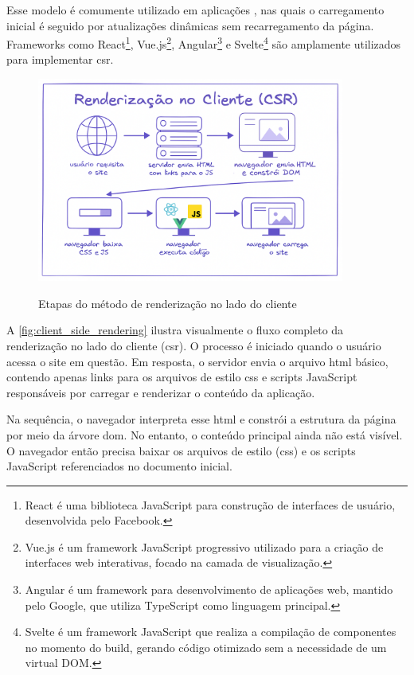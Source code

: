 Esse modelo é comumente utilizado em aplicações , nas quais o carregamento inicial é seguido por atualizações dinâmicas sem recarregamento da página. Frameworks como React\footnote{React é uma biblioteca JavaScript para construção de interfaces de usuário, desenvolvida pelo Facebook.}, Vue.js\footnote{Vue.js é um framework JavaScript progressivo utilizado para a criação de interfaces web interativas, focado na camada de visualização.}, Angular\footnote{Angular é um framework para desenvolvimento de aplicações web, mantido pelo Google, que utiliza TypeScript como linguagem principal.} e Svelte\footnote{Svelte é um framework JavaScript que realiza a compilação de componentes no momento do build, gerando código otimizado sem a necessidade de um virtual DOM.} são amplamente utilizados para implementar \acrshort{csr}.

\begin{figure}[h!]
    \centering
    \caption{Etapas do método de renderização no lado do cliente}
    \includegraphics[width=0.9\textwidth]{media/client_side_rendering.png}
    \label{fig:client_side_rendering}
\end{figure}

A \autoref{fig:client_side_rendering} ilustra visualmente o fluxo completo da renderização no lado do cliente (\acrshort{csr}). O processo é iniciado quando o usuário acessa o site em questão. Em resposta, o servidor envia o arquivo \acrshort{html} básico, contendo apenas links para os arquivos de estilo \acrshort{css} e scripts JavaScript responsáveis por carregar e renderizar o conteúdo da aplicação.

Na sequência, o navegador interpreta esse \acrshort{html} e constrói a estrutura da página por meio da árvore \acrshort{dom}. No entanto, o conteúdo principal ainda não está visível. O navegador então precisa baixar os arquivos de estilo (\acrshort{css}) e os scripts JavaScript referenciados no documento inicial.

